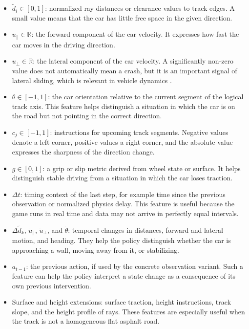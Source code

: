 \begin{itemize}
    \item \(\tilde{d}_i \in [0,1]\): normalized ray distances or clearance values to track edges. A small value means that the car has little free space in the given direction.
    \item \(u_{\parallel} \in \mathbb{R}\): the forward component of the car velocity. It expresses how fast the car moves in the driving direction.
    \item \(u_{\perp} \in \mathbb{R}\): the lateral component of the car velocity. A significantly non-zero value does not automatically mean a crash, but it is an important signal of lateral sliding, which is relevant in vehicle dynamics \cite{rajamani2012vehicle_dynamics}.
    \item \(\theta \in [-1,1]\): the car orientation relative to the current segment of the logical track axis. This feature helps distinguish a situation in which the car is on the road but not pointing in the correct direction.
    \item \(c_j \in [-1,1]\): instructions for upcoming track segments. Negative values denote a left corner, positive values a right corner, and the absolute value expresses the sharpness of the direction change.
    \item \(g \in [0,1]\): a grip or slip metric derived from wheel state or surface. It helps distinguish stable driving from a situation in which the car loses traction.
    \item \(\Delta t\): timing context of the last step, for example time since the previous observation or normalized physics delay. This feature is useful because the game runs in real time and data may not arrive in perfectly equal intervals.
    \item \(\Delta \tilde{d}_k\), \(\dot{u}_{\parallel}\), \(\dot{u}_{\perp}\), and \(\dot{\theta}\): temporal changes in distances, forward and lateral motion, and heading. They help the policy distinguish whether the car is approaching a wall, moving away from it, or stabilizing.
    \item \(a_{t-1}\): the previous action, if used by the concrete observation variant. Such a feature can help the policy interpret a state change as a consequence of its own previous intervention.
    \item Surface and height extensions: surface traction, height instructions, track slope, and the height profile of rays. These features are especially useful when the track is not a homogeneous flat asphalt road.
\end{itemize}

